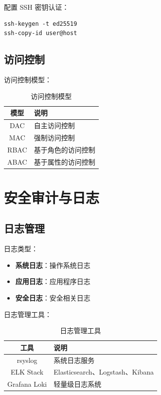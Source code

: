 \documentclass[12pt,UTF8]{ctexbook}
\begin{document}
配置 SSH 密钥认证：
\begin{verbatim}
ssh-keygen -t ed25519
ssh-copy-id user@host
\end{verbatim}

\section{访问控制}
\label{sec:access_control}

访问控制模型：
\begin{table}[htbp]
    \centering
    \caption{访问控制模型}
    \begin{tabular}{|c|p{8cm}|}
        \hline
        \textbf{模型} & \textbf{说明} \\
        \hline
        DAC & 自主访问控制 \\
        \hline
        MAC & 强制访问控制 \\
        \hline
        RBAC & 基于角色的访问控制 \\
        \hline
        ABAC & 基于属性的访问控制 \\
        \hline
    \end{tabular}
\end{table}

\chapter{安全审计与日志}
\label{chap:audit}

\section{日志管理}
\label{sec:log_management}

日志类型：
\begin{itemize}
    \item \textbf{系统日志}：操作系统日志
    \item \textbf{应用日志}：应用程序日志
    \item \textbf{安全日志}：安全相关日志
\end{itemize}

日志管理工具：
\begin{table}[htbp]
    \centering
    \caption{日志管理工具}
    \begin{tabular}{|c|p{8cm}|}
        \hline
        \textbf{工具} & \textbf{说明} \\
        \hline
        rsyslog & 系统日志服务 \\
        \hline
        ELK Stack & Elasticsearch、Logstash、Kibana \\
        \hline
        Grafana Loki & 轻量级日志系统 \\
        \hline
    \end{tabular}
\end{table}
\end{document}
